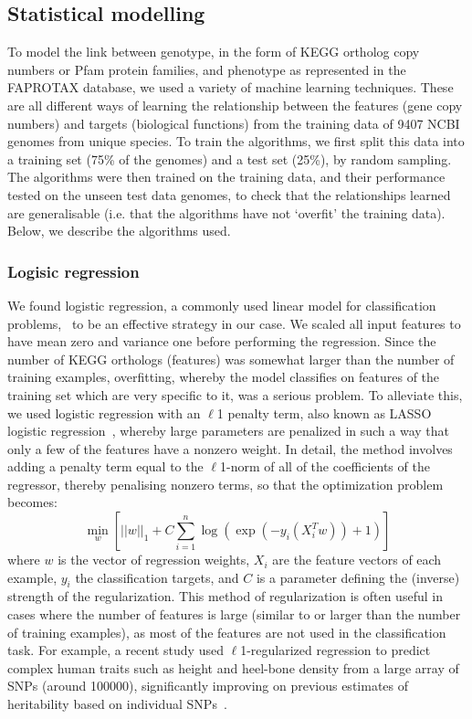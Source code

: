 \documentclass[10pt,letterpaper]{article}
\begin{document}
\subsection*{Statistical modelling}
To model the link between genotype, in the form of KEGG ortholog copy numbers or Pfam protein families, and phenotype as represented in the FAPROTAX database, we used a variety of machine learning techniques. These are all different ways of learning the relationship between the features (gene copy numbers) and targets (biological functions) from the training data of 9407 NCBI genomes from unique species. To train the algorithms, we first split this data into a training set (75\% of the genomes) and a test set (25\%), by random sampling. The algorithms were then trained on the training data, and their performance tested on the unseen test data genomes, to check that the relationships learned are generalisable (i.e. that the algorithms have not `overfit' the training data). Below, we describe the algorithms used.

\subsubsection*{Logisic regression}
We found logistic regression, a commonly used linear model for classification problems,~\cite{Hastie2009a,Freedman2009} to be an effective strategy in our case. We scaled all input features to have mean zero and variance one before performing the regression. Since the number of KEGG orthologs (features) was somewhat larger than the number of training examples, overfitting, whereby the model classifies on features of the training set which are very specific to it, was a serious problem. To alleviate this, we used logistic regression with an $\ell$1 penalty term, also known as LASSO logistic regression~\cite{Lee2006}, whereby large parameters are penalized in such a way that only a few of the features have a nonzero weight. In detail, the method involves adding a penalty term equal to the $\ell$1-norm of all of the coefficients of the regressor, thereby penalising nonzero terms, so that the optimization problem becomes:
\begin{equation}
\min_{w}\left[||w||_1 + C\sum_{i=1}^{n}\log\left(\exp(-y_i(X_i^T w )) + 1\right)\right]
\end{equation}
where $w$ is the vector of regression weights, $X_i$ are the feature vectors of each example, $y_i$ the classification targets, and $C$ is a parameter defining the (inverse) strength of the regularization. This method of regularization is often useful in cases where the number of features is large (similar to or larger than the number of training examples), as most of the features are not used in the classification task. For example, a recent study used $\ell$1-regularized regression to predict complex human traits such as height and heel-bone density from a large array of SNPs (around 100000), significantly improving on previous estimates of heritability based on individual SNPs~\cite{Lello2017}. 
\end{document}
